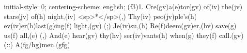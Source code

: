 initial-style: 0;
centering-scheme: english;
(f3)1. Cre(gv)a(e)tor(gv) of(iv) the(jv) stars(jv) of(h) night,(iv) <sp>*</sp>(,)
Thy(iv) peo(jv)ple's(h) ev(iv)er(h)last(g)ing(f) light,(gv) (;)
Je(iv)su,(h) Re(f)deem(gv)er,(hv) save(g) us(f) all,(e) (,)
And(e) hear(gv) thy(hv) ser(iv)vants(h) when(g) they(f) call.(gv) (::) A(fg/hg)men.(gfg)